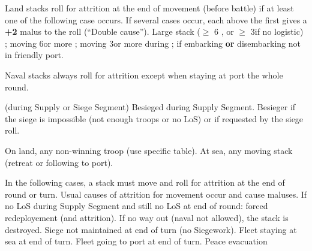  Land stacks roll for attrition at the end of
movement (before battle) if at least one of the following case occurs. If
several cases occur, each above the first gives a \textbf{+2} malus to the
roll (``Double cause'').
\bparag Large stack ($\geq$ 6 \LD, or $\geq$ 3\LD if no logistic) ;
\bparag moving 6\MP or more ;
\bparag moving 3\MP or more during  ;
\bparag if embarking \textbf{or} disembarking not in friendly port.

 Naval stacks always roll for attrition except when
staying at port the whole round.

 (during Supply or Siege Segment)
\bparag Besieged during Supply Segment.
\bparag Besieger if the siege is impossible (not enough troops or no LoS) or
if requested by the siege roll.

\bparag On land, any non-winning troop (use specific table).
\bparag At sea, any moving stack (retreat or following to port).

 In the following cases, a stack
must move and roll for attrition at the end of round or turn. Usual causes of
attrition for movement occur and cause maluses.
\bparag If no LoS during Supply Segment and still no LoS at end of round:
forced redeployement (and attrition). If no way out (naval not allowed), the
stack is destroyed.
\bparag Siege not maintained at end of turn (no Siegework\faceplus).
\bparag Fleet staying at sea at end of turn.
\bparag Fleet going to port at end of turn.
\bparag Peace evacuation


